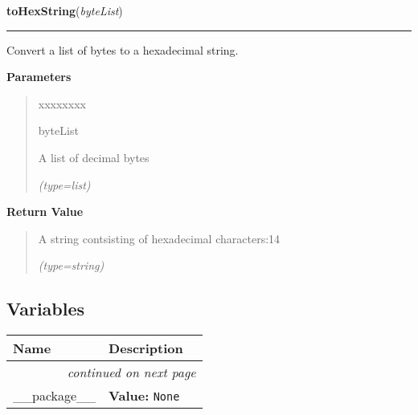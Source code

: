 \hspace{.8\funcindent}\begin{boxedminipage}{\funcwidth}

    \raggedright \textbf{toHexString}(\textit{byteList})

    \vspace{-1.5ex}

    \rule{\textwidth}{0.5\fboxrule}
\setlength{\parskip}{2ex}
    Convert a list of bytes to a hexadecimal string.

\setlength{\parskip}{1ex}
      \textbf{Parameters}
      \vspace{-1ex}

      \begin{quote}
        \begin{Ventry}{xxxxxxxx}

          \item[byteList]

          A list of decimal bytes

            {\it (type=list)}

        \end{Ventry}

      \end{quote}

      \textbf{Return Value}
    \vspace{-1ex}

      \begin{quote}
      A string contsisting of hexadecimal characters:14

      {\it (type=string)}

      \end{quote}

    \end{boxedminipage}



  \subsection{Variables}

    \vspace{-1cm}
\hspace{\varindent}\begin{longtable}{|p{\varnamewidth}|p{\vardescrwidth}|l}
\cline{1-2}
\cline{1-2} \centering \textbf{Name} & \centering \textbf{Description}& \\
\cline{1-2}
\endhead\cline{1-2}\multicolumn{3}{r}{\small\textit{continued on next page}}\\\endfoot\cline{1-2}
\endlastfoot\raggedright \_\-\_\-p\-a\-c\-k\-a\-g\-e\-\_\-\_\- & \raggedright \textbf{Value:} 
{\tt None}&\\
\cline{1-2}
\end{longtable}

